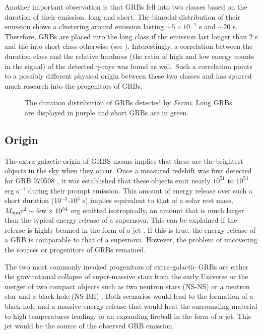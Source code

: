 Another important observation is that GRBs fell into two classes based
on the duration of their emission: long and short. The bimodal
distribution of their emission shows a clustering around emission
lasting $\sim5\times 10^{-1}$ s and $\sim$20 s. Therefore, GRBs are
placed into the long class if the emission last longer than 2 s and
the into short class otherwise \cite{ck:1993} (see
). Interestingly, a correlation between the
duration class and the relative hardness (the ratio of high and low
energy counts in the signal) of the detected $\gamma$-rays was found
as well. Such a correlation points to a possibly different physical
origin between these two classes and has spurred much research into
the progenitors of GRBs.

\begin{figure}[h]
  \centering
  \caption{The duration distribution of GRBs detected by {\it
      Fermi}. Long GRBs are displayed in purple and short GRBs are in
    green.}
  \label{fig:t90}
\end{figure}

\subsection{Origin}
The extra-galactic origin of GRBS means implies that these are the
brightest objects in the sky when they occur. Once a measured redshift
was first detected for GRB 970508 \cite{Paradijs:1997,Costa:1997}, it
was established that these objects emit nearly $10^{51}$ to $10^{53}$
erg s$^{-1}$ during their prompt emission. This amount of energy
release over such a short duration (10$^{-3}$-10$^3$ s) implies
equivalent to that of a solar rest mass, $M_{\rm sun}c^2\sim {\rm few}
\times 10^{54}$ erg emitted isotropically, an amount that is much
larger than the typical energy release of a supernova. This can be
explained if the release is highly beamed in the form of a jet
\cite{Castro:1999,Fruchter:1999,Kulkarni:1999}. If this is true, the
energy release of a GRB is comparable to that of a supernova. However,
the problem of uncovering the sources or progenitors of GRBs remained.

The two most commonly invoked progenitors of extra-galactic GRBs are
either the gravitational collapse of super-massive stars from the
early Universe or the merger of two compact objects such as two
neutron stars (NS-NS) or a neutron star and a black hole (NS-BH)
\cite{Woosley:1993,Paczynski:1998,Paczynski:1986,Eichler:1989}. Both
scenarios would lead to the formation of a black hole and a massive
energy release that would heat the surrounding material to high
temperatures leading, to an expanding fireball in the form of a
jet. This jet would be the source of the observed GRB emission.

